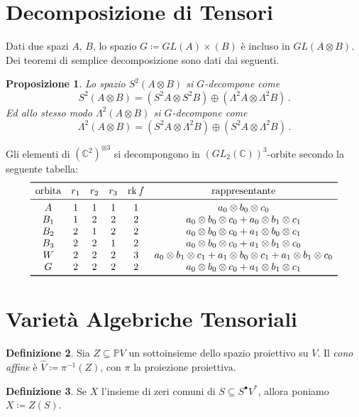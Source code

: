 \documentclass[a4paper, 11pt]{article}
\theoremstyle{definition}
\newtheorem{Def}{Definizione}[section]
\theoremstyle{plain}
\newtheorem{Prop}[Def]{Proposizione}
\newcommand{\PP}{\mathbb{P}}
\newcommand{\C}{\mathbb{C}}
\newcommand{\deff}{\coloneqq}
\DeclareMathOperator{\rk}{rk}
\begin{document}
\section{Decomposizione di Tensori}

Dati due spazi $A$, $B$, lo spazio $G \deff GL(A) \times (B)$ è incluso in $GL(A\otimes B)$. Dei teoremi di semplice decomposizione sono dati dai seguenti.
\begin{Prop}
	Lo spazio $S^2(A\otimes B)$ si $G$-decompone come
	\[
		S^2(A \otimes B) = (S^2A \otimes S^2B) \oplus (\Lambda^2A \otimes \Lambda^2B)\,.
	\]
	Ed allo stesso modo $\Lambda^2(A\otimes B)$ si $G$-decompone come
	\[
		\Lambda^2(A\otimes B) = (S^2A \otimes \Lambda^2B) \oplus (S^2A \otimes \Lambda^2B)\,.
	\]
\end{Prop} 

Gli elementi di $(\C^2)^{\otimes 3}$ si decompongono in $(GL_2(\C))^3$-orbite secondo la seguente tabella:
\[
\begin{array}{cccccc}
	\toprule
	\text{orbita} & r_1 & r_2 & r_3 &  \rk f & \text{rappresentante}\\
	\midrule
	A & 1 & 1 & 1 & 1 & a_0\otimes b_0 \otimes c_0 \\
	B_1 & 1 & 2 & 2 & 2 & a_0\otimes b_0 \otimes c_0 + a_0\otimes b_1 \otimes c_1\\
	B_2 & 2 & 1 & 2 & 2 & a_0\otimes b_0 \otimes c_0 + a_1\otimes b_0 \otimes c_1\\
	B_3 & 2 & 2 & 1 & 2 & a_0\otimes b_0 \otimes c_0 + a_1\otimes b_1 \otimes c_0\\
	W & 2 & 2 & 2 & 3 & a_0\otimes b_1 \otimes c_1 + a_1\otimes b_0 \otimes c_1 + a_1\otimes b_1 \otimes c_0\\
	G & 2 & 2 & 2 & 2 & a_0\otimes b_0 \otimes c_0 + a_1\otimes b_1 \otimes c_1 \\
	\bottomrule
\end{array}
\]
\section{Varietà Algebriche Tensoriali}
\begin{Def}
	Sia $Z \subseteq \PP V$ un sottoinsieme dello spazio proiettivo su $V$. Il \emph{cono affine} è $\hat{V} \deff \pi^{-1}(Z)$, con $\pi$ la proiezione proiettiva.
\end{Def}
\begin{Def}
	Se $X$ l'insieme di zeri comuni di $S \subseteq S^\bullet V^\ast$, allora poniamo $X \deff Z(S)$.
\end{Def}
\end{document}
